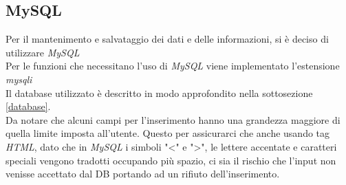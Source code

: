 \subsection{MySQL}
Per il mantenimento e salvataggio dei dati e delle informazioni, si è deciso di utilizzare \emph{MySQL}\\
Per le funzioni che necessitano l'uso di \emph{MySQL} viene implementato l'estensione \emph{mysqli}\\
Il database utilizzato è descritto in modo approfondito nella sottosezione \ref{database}.\\
Da notare che alcuni campi per l'inserimento hanno una grandezza maggiore di quella limite imposta all'utente. 
Questo per assicurarci che anche usando tag \emph{HTML}, dato che in \emph{MySQL} i simboli "<" e ">", le lettere accentate e caratteri speciali vengono tradotti occupando più spazio, ci sia il rischio che l'input non venisse accettato dal DB portando ad un rifiuto dell'inserimento.